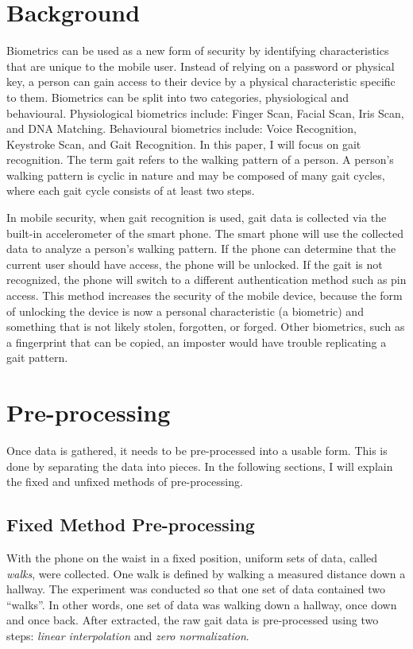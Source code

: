 \documentclass{sig-alternate}
\begin{document}
\section{Background}
	Biometrics can be used as a new form of security by identifying characteristics that are unique to the mobile user. Instead of relying on a password or physical key, a person can gain access to their device by a physical characteristic specific to them. Biometrics can be split into two categories, physiological and behavioural. Physiological biometrics include: Finger Scan, Facial Scan, Iris Scan, and DNA Matching. Behavioural biometrics include: Voice Recognition, Keystroke Scan, and Gait Recognition. In this paper, I will focus on gait recognition. The term gait refers to the walking pattern of a person. A person's walking pattern is cyclic in nature and may be composed of many gait cycles, where each gait cycle consists of at least two steps.~\cite{Sujithra:2012} 
	
	In mobile security, when gait recognition is used, gait data is collected via the built-in accelerometer of the smart phone. The smart phone will use the collected data to analyze a person's walking pattern. If the phone can determine that the current user should have access, the phone will be unlocked. If the gait is not recognized, the phone will switch to a different authentication method such as pin access. This method increases the security of the mobile device, because the form of unlocking the device is now a personal characteristic (a biometric) and something that is not likely stolen, forgotten, or forged. Other biometrics, such as a fingerprint that can be copied, an imposter would have trouble replicating a gait pattern.


\section{Pre-processing} 
	Once data is gathered, it needs to be pre-processed into a usable form. This is done by separating the data into pieces. In the following sections, I will explain the fixed and unfixed methods of pre-processing.

    
\subsection{Fixed Method Pre-processing}	
	With the phone on the waist in a fixed position, uniform sets of data, called \textit{walks}, were collected. One walk is defined by walking a measured distance down a hallway. The experiment was conducted so that one set of data contained two ``walks''. In other words, one set of data was walking down a hallway, once down and once back. After extracted, the raw gait data is pre-processed using two steps: \textit{linear interpolation} and \textit{zero normalization}. 
			
\end{document}
